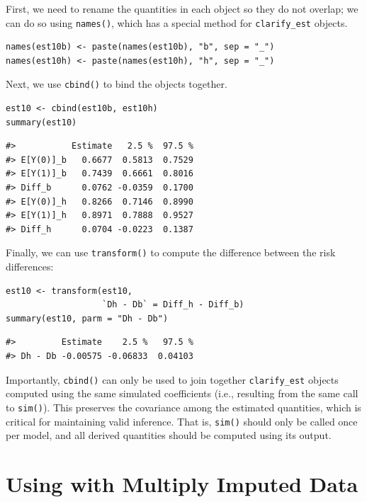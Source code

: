 First, we need to rename the quantities in each object so they do not overlap; we can do so using \texttt{names()}, which has a special method for \texttt{clarify\_est} objects.

\begin{verbatim}
names(est10b) <- paste(names(est10b), "b", sep = "_")
names(est10h) <- paste(names(est10h), "h", sep = "_")
\end{verbatim}

Next, we use \texttt{cbind()} to bind the objects together.

\begin{verbatim}
est10 <- cbind(est10b, est10h)
summary(est10)
\end{verbatim}

\begin{verbatim}
#>           Estimate   2.5 %  97.5 %
#> E[Y(0)]_b   0.6677  0.5813  0.7529
#> E[Y(1)]_b   0.7439  0.6661  0.8016
#> Diff_b      0.0762 -0.0359  0.1700
#> E[Y(0)]_h   0.8266  0.7146  0.8990
#> E[Y(1)]_h   0.8971  0.7888  0.9527
#> Diff_h      0.0704 -0.0223  0.1387
\end{verbatim}

Finally, we can use \texttt{transform()} to compute the difference between the risk differences:

\begin{verbatim}
est10 <- transform(est10,
                   `Dh - Db` = Diff_h - Diff_b)
summary(est10, parm = "Dh - Db")
\end{verbatim}

\begin{verbatim}
#>         Estimate    2.5 %   97.5 %
#> Dh - Db -0.00575 -0.06833  0.04103
\end{verbatim}

Importantly, \texttt{cbind()} can only be used to join together \texttt{clarify\_est} objects computed using the same simulated coefficients (i.e., resulting from the same call to \texttt{sim()}). This preserves the covariance among the estimated quantities, which is critical for maintaining valid inference. That is, \texttt{sim()} should only be called once per model, and all derived quantities should be computed using its output.

\hypertarget{using-with-multiply-imputed-data}{%
\section{\texorpdfstring{Using  with Multiply Imputed Data}{Using  with Multiply Imputed Data}}\label{using-with-multiply-imputed-data}}

